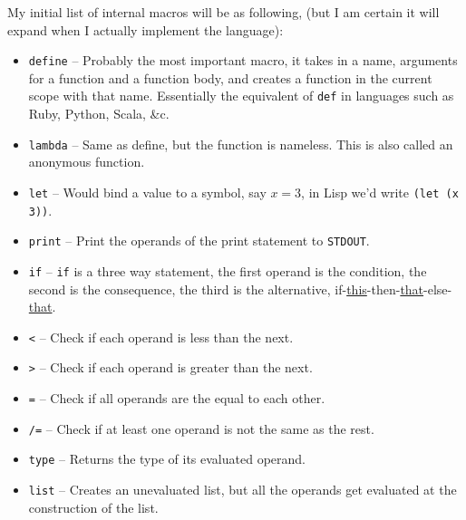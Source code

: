 \documentclass{article}
\newcommand{\code}[1]{\texttt{#1}}
\newcommand{\etc}{{\&}c.}
\begin{document}
      \clearpage
      My initial list of internal macros will be as following, (but I am certain
      it will expand when I actually implement the language):

      \begin{itemize}
        \item \code{define} -- Probably the most important macro, it takes in a
                               name, arguments for a function and a function body,
                               and creates a
                               function in the current scope with that name.
                               Essentially the equivalent of \code{def} in
                               languages such as Ruby, Python, Scala, \etc

        \item \code{lambda} -- Same as define, but the function is nameless.
                               This is also called an anonymous function.

        \item \code{let} -- Would bind a value to a symbol, say $x = 3$, in Lisp
                            we'd write \code{(let (x 3))}.

        \item \code{print} -- Print the operands of the print statement to \code{STDOUT}.
        \item \code{if} -- \code{if} is a three way statement, the first operand is the
                           condition, the second is the consequence, the third
                           is the alternative,
                           if-\underline{this}-then-\underline{that}-else-\underline{that}.

        \item \code{<} -- Check if each operand is less than the next.
        \item \code{>} -- Check if each operand is greater than the next.
        \item \code{=} -- Check if all operands are the equal to each other.
        \item \code{/=} -- Check if at least one operand is not the same as the rest.

        \item \code{type} -- Returns the type of its evaluated operand.

        \item \code{list} -- Creates an unevaluated list, but all the operands
                             get evaluated at the construction of the list.




\end{itemize}
\end{document}
